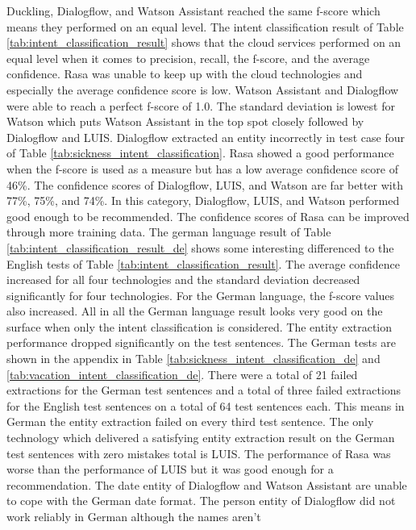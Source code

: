 Duckling, Dialogflow, and Watson Assistant reached the same f-score which means they 
performed on an equal level.
The intent classification result of Table \ref{tab:intent_classification_result}
shows that the cloud services performed on an equal level when it comes to 
precision, recall, the f-score, and the average confidence.
Rasa was unable to keep up with the cloud technologies and especially the average 
confidence score is low.
Watson Assistant and Dialogflow were able to reach a perfect f-score of 1.0.
The standard deviation is lowest for Watson which puts Watson Assistant in the top 
spot closely followed by Dialogflow and LUIS.
Dialogflow extracted an entity incorrectly 
in test case four of Table \ref{tab:sickness_intent_classification}.
Rasa showed a good performance when the f-score is used as a measure but 
has a low average confidence score of 46\%.
The confidence scores of Dialogflow, LUIS, and Watson are far better with 77\%, 75\%, and 74\%.
In this category, Dialogflow, LUIS, and Watson performed good enough to be recommended.
The confidence scores of Rasa can be improved through more training data.
The german language result of Table \ref{tab:intent_classification_result_de} shows some interesting 
differenced to the English tests of Table \ref{tab:intent_classification_result}.
The average confidence increased for all four technologies and the standard deviation 
decreased significantly for four technologies.
For the German language, the f-score values also increased.
All in all the German language result looks very good on the surface when only the intent 
classification is considered.
The entity extraction performance dropped significantly on the test sentences.
The German tests are shown in the appendix in Table \ref{tab:sickness_intent_classification_de} and \ref{tab:vacation_intent_classification_de}.
There were a total of 21 failed extractions for the German test sentences and a total of three failed 
extractions for the English test sentences on a total of 64 test sentences each.
This means in German the entity extraction failed on every third test sentence.
The only technology which delivered a satisfying entity extraction result on the German 
test sentences with zero mistakes total is LUIS.
The performance of Rasa was worse than the performance of LUIS but it was good enough
for a recommendation.
The date entity of Dialogflow and Watson Assistant are unable to cope with the German date format.
The person entity of Dialogflow did not work reliably in German although the names aren't 

